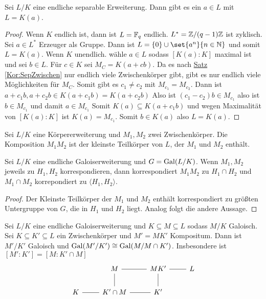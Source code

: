 \begin{Satz}\label{Satz:PrimElt}
Sei \(L/K\) eine endliche separable Erweiterung. Dann gibt es ein \(a\in L\) mit \(L=K(a)\).
    
\end{Satz}
\begin{proof}
    Wenn \(K\) endlich ist, dann ist \(L=\mathbb{F}_q\) endlich.
    \(L^*=\mathbb{Z}/(q-1)\mathbb{Z}\) ist zyklisch. Sei \(a\in L^*\) Erzeuger als Gruppe. Dann ist 
    \(L=\Set{0}\cup \set{a^n}{ n\in\NN}\) und somit \(L=K(a)\). Wenn \(K\) unendlich. wähle \(a\in L\) sodass \([K(a):K]\) maximal ist und sei \(b\in L\). Für \(c\in K\) sei \(M_C=K(a+cb)\). Da es nach \hyperref[Kor:SepZwischen]{Satz} \ref{Kor:SepZwischen} nur endlich viele Zwischenkörper gibt, gibt es nur endlich viele Möglichkeiten für \(M_C\). Somit gibt es \(c_1\neq c_2\) mit \(M_{c_1}=M_{c_2}\). Dann ist \(a+c_1b,a+c_2b\in K(a+c_1b)=K(a+c_2b)\)
    Also ist \((c_1-c_2)b\in M_{c_1}\) also ist \(b\in M_{c_1}\) und damit \(a\in M_{c_1}\)
    Somit \(K(a)\subseteq K(a+c_1b)\) und wegen Maximalität von \([K(a):K]\) ist \(K(a)=M_{c_1}\). Somit \(b\in K(a)\) also \(L=K(a).\)
\end{proof}
\begin{Def}
    Sei \(L/K\) eine Körpererweiterung und \(M_1,M_2\) zwei Zwischenkörper. Die Komposition \(M_1M_2\) ist der kleinste Teilkörper von \(L\), der \(M_1\) und \(M_2\) enthält.
\end{Def}
\begin{Satz}
    Sei \(L/K\) eine endliche Galoiserweiterung und \(G=\operatorname{Gal}(L/K)\). Wenn \(M_1,M_2\) jeweils zu \(H_1,H_2\) korrespondieren, dann korrespondiert \(M_1M_2\) zu \(H_1\cap H_2\) und \(M_1\cap M_2\) korrepondiert zu \(\langle H_1,H_2\rangle\).
\end{Satz}
\begin{proof}
    Der Kleinste Teilkörper der \(M_1\) und \(M_2\) enthält korrespondiert zu größten Untergruppe von \(G\), die in \(H_1\) und \(H_2\) liegt. Analog folgt die andere Aussage.
\end{proof}
\begin{Satz}[Translationssatz]\label{Satz:Translat}
    Sei \(L/K\) eine endliche Galoiserweiterung und \(K\subseteq M\subseteq L\) sodass \(M/K\) Galoisch. Sei \(K\subseteq K'\subseteq L\) ein Zwischenkörper und \(M'=MK'\) Kompositum. Dann ist \(M'/K'\) Galoisch und \(\operatorname{Gal}(M'/K')\cong \operatorname{Gal}(M/M\cap K')\). Insbesondere ist \([M':K']=[M:K'\cap M]\)
    $$%
\begin{tikzcd}
                     & M \arrow[r, no head]                           & MK' \arrow[r, no head] & L \\
K \arrow[r, no head] & K'\cap M \arrow[r, no head] \arrow[u, no head] & K' \arrow[u, no head] &  
\end{tikzcd}$$
\end{Satz}
